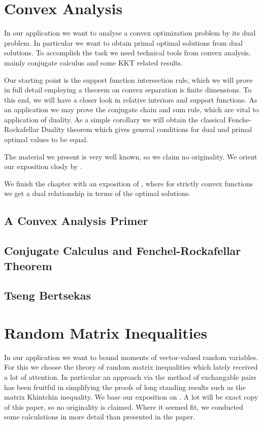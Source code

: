 \documentclass[11pt, a4paper, BCOR=10mm, DIV=9]{scrbook}
\theoremstyle{definition}
\theoremstyle{plain}
\begin{document}
\chapter{Convex Analysis}
In our application we want to analyse a convex optimization problem by its dual problem.
In particular we want to obtain primal optimal solutions from dual solutions.
To accomplish the task we need technical tools from convex analysis, 
mainly conjugate calculus and some KKT related results.

Our starting point is the support function intersection rule, which we will prove in full detail employing a theorem on convex separation is finite dimensions.
To this end, we will have a closer look in relative interiors and support functions.
As an application we may prove the conjugate chain and sum rule,
which are vital to application of duality. As a simple corollary we will obtain the classical Fenche-Rockafellar Duality theorem
which gives general conditions for dual und primal optimal values to be equal.

The material we present is very well known, so we claim no originality. We orient our exposition closly by
\cite{Rockafellar1970, Mordukhovich2022}
.

We finish the chapter with an exposition of \cite{Tseng1991}, where for strictly convex functions we get a dual relationship in terms of the optimal solutions.
  \section{A Convex Analysis Primer}
  
  \section{Conjugate Calculus and Fenchel-Rockafellar Theorem}
  
%
  \section{Tseng Bertsekas}
  


\chapter{Random Matrix Inequalities}
  In our application we want to bound moments of vector-valued random variables.
  For this we choose the theory of random matrix inequalities
  which lately received a lot of attention.
  In particular an approach via the method of exchangable pairs \cite{Mackey2014}
  has been fruitful in simplifying the proofs of long standing results such as the matrix Khintchin inequality.
  We base our exposition on \cite{Mackey2014}. A lot will be exact copy of this paper, so no originality is claimed. Where it seemed fit, we conducted some calculations in more detail than presented in the paper. 
\end{document}
